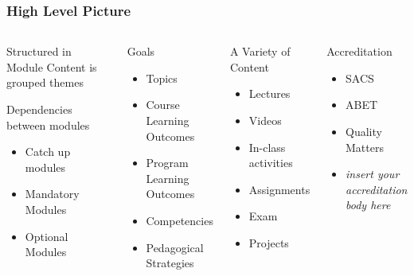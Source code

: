 \documentclass[aspectratio=169]{beamer}
\begin{document}
\begin{frame}
  \frametitle{High Level Picture}

  \begin{columns}
    \begin{block}{Structured in Module}
      Content is grouped themes

      Dependencies between modules

      \begin{itemize}
      \item Catch up modules
      \item Mandatory Modules
      \item Optional Modules
      \end{itemize}
      
    \end{block}

  \begin{block}{Goals}
    \begin{itemize}
    \item Topics
    \item Course Learning Outcomes
    \item Program Learning Outcomes
    \item Competencies
    \item Pedagogical Strategies
    \end{itemize}
  \end{block}

  
  \begin{block}{A Variety of Content}
    \begin{itemize}
    \item Lectures
    \item Videos
    \item In-class activities
    \item Assignments
    \item Exam
    \item Projects
    \end{itemize}
  \end{block}


  \begin{block}{Accreditation}
    \begin{itemize}
    \item SACS
    \item ABET
    \item Quality Matters
    \item \textit{insert your accreditation body here}
    \end{itemize}
  \end{block}
  \end{columns}
  
\end{frame}
\end{document}
